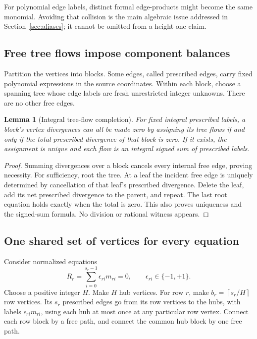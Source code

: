 \documentclass[11pt]{article}
\newtheorem{lemma}[theorem]{Lemma}
\theoremstyle{definition}\newtheorem{definition}[theorem]{Definition}
\theoremstyle{remark}\newtheorem{remark}[theorem]{Remark}
\newcommand{\ceil}[1]{\left\lceil #1\right\rceil}
\begin{document}
For polynomial edge labels, distinct formal edge-products might become the same
monomial. Avoiding that collision is the main algebraic issue addressed in
Section~\ref{sec:aliases}; it cannot be omitted from a height-one claim.

\subsection{Free tree flows impose component balances}
Partition the vertices into blocks. Some edges, called prescribed edges, carry
fixed polynomial expressions in the source coordinates. Within each block,
choose a spanning tree whose edge labels are fresh unrestricted integer
unknowns. There are no other free edges.

\begin{lemma}[Integral tree-flow completion]\label{lem:tree}
For fixed integral prescribed labels, a block's vertex divergences can all be
made zero by assigning its tree flows if and only if the total prescribed
divergence of that block is zero. If it exists, the assignment is unique and
each flow is an integral signed sum of prescribed labels.
\end{lemma}
\begin{proof}
Summing divergences over a block cancels every internal free edge, proving
necessity. For sufficiency, root the tree. At a leaf the incident free edge is
uniquely determined by cancellation of that leaf's prescribed divergence.
Delete the leaf, add its net prescribed divergence to the parent, and repeat.
The last root equation holds exactly when the total is zero. This also proves
uniqueness and the signed-sum formula. No division or rational witness appears.
\end{proof}

\subsection{One shared set of vertices for every equation}
Consider normalized equations
\begin{equation}\label{eq:normalized}
 R_r=\sum_{i=0}^{s_r-1}\epsilon_{ri}m_{ri}=0,
       \qquad \epsilon_{ri}\in\{-1,+1\}.
\end{equation}
Choose a positive integer $H$. Make $H$ hub vertices. For row $r$, make
$b_r=\ceil{s_r/H}$ row vertices. Its $s_r$ prescribed edges go from its row
vertices to the hubs, with labels $\epsilon_{ri}m_{ri}$, using each hub at most
once at any particular row vertex. Connect each row block by a free path, and
connect the common hub block by one free path.
\end{document}
